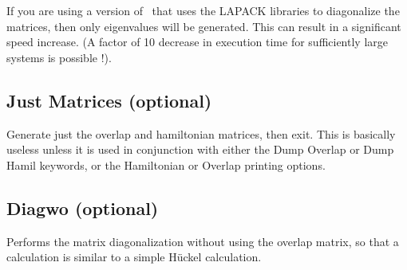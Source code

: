 If you are using a version of \calcprog\ that uses the
LAPACK libraries to diagonalize the matrices, then only 
eigenvalues will be generated.  This can result in a significant speed
increase.  (A factor of 10 decrease in execution time for
sufficiently large systems is possible !).

\subsection{{\sf Just Matrices} (optional)}

Generate just the overlap and hamiltonian matrices, then exit.  This
is basically useless unless it is used in conjunction with either the
{\sf Dump Overlap} or {\sf Dump Hamil} keywords, or the {\sf
Hamiltonian} or {\sf Overlap} printing options.

\subsection{{\sf Diagwo} (optional)}

Performs the matrix diagonalization without using the overlap matrix,
so that a calculation is similar to a simple H\"uckel calculation.


